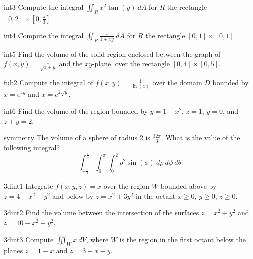 \begin{problem}{int3}
    Compute the integral $\iint_R x^2\tan(y) \ dA$ for $R$ the rectangle $[0,2] \times [0, \frac{\pi}{3}]$
\end{problem}

\begin{problem}{int4}
    Compute the integral $\iint_R \frac{x}{1+xy} \ dA$ for $R$ the rectangle $[0,1] \times [0, 1]$
\end{problem}

\begin{problem}{int5}
    Find the volume of the solid region enclosed between the graph of  $f(x,y) = \frac{1}{\sqrt{x+y}}$ and the $xy$-plane, over the rectangle $[0,4] \times [0,5]$.	
\end{problem}

\begin{problem}{fub2}
    Compute the integral of $f(x,y) = \frac{1}{\ln(x)}$ over the domain $D$ bounded by $x = e^{4y}$ and $x= e^{2\sqrt{y}}$.
\end{problem}

\begin{problem}{int6}
    Find the volume of the region bounded by $y = 1-x^2$, $z = 1$, $y = 0$, and $z+y=2$.
\end{problem}

\begin{problem}{symmetry}
    The volume of a sphere of radius 2 is $\frac{32\pi}{3}$.  What is the value of the following integral?$$\int_{-\frac{\pi}{4}}^{\frac{\pi}{4}}\int_0^\pi\int_0^2 \rho^2 \sin(\phi) \ d\rho \ d\phi \ d\theta$$
\end{problem}

\begin{problem}{3dint1}
    Integrate $f(x,y,z) = x$ over the region $W$ bounded above by $z = 4-x^2-y^2$ and below by $z=x^2+3y^2$ in the octant $x \geq 0$, $y \geq 0$, $z \geq 0$.
\end{problem}

\begin{problem}{3dint2}
    Find the volume between the intersection of the surfaces $z = x^2 + y^2$ and $z = 10 - x^2 - y^2$.
\end{problem}

\begin{problem}{3dint3}
    Compute $\iiint_W x \ dV$, where $W$ is the region in the first octant below the planes $z = 1-x$ and $z = 3 - x- y$.
\end{problem}










